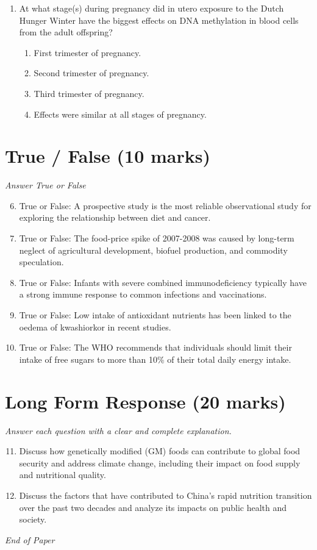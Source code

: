 \documentclass[12pt]{article}
\begin{document}
\begin{enumerate}[label=\arabic*.]
\begin{enumerate}[label=(\alph*)]
\end{enumerate}
\item At what stage(s) during pregnancy did in utero exposure to the Dutch Hunger Winter have the biggest effects on DNA methylation in blood cells from the adult offspring?
\begin{enumerate}[label=(\alph*)]
    \item First trimester of pregnancy.
    \item Second trimester of pregnancy.
    \item Third trimester of pregnancy.
    \item Effects were similar at all stages of pregnancy.
\end{enumerate}
\end{enumerate}

\section*{True / False (10 marks)}
\textit{Answer True or False}
\begin{enumerate}[label=\arabic*.]
\setcounter{enumi}{5}
\item True or False: A prospective study is the most reliable observational study for exploring the relationship between diet and cancer.
\item True or False: The food-price spike of 2007-2008 was caused by long-term neglect of agricultural development, biofuel production, and commodity speculation.
\item True or False: Infants with severe combined immunodeficiency typically have a strong immune response to common infections and vaccinations.
\item True or False: Low intake of antioxidant nutrients has been linked to the oedema of kwashiorkor in recent studies.
\item True or False: The WHO recommends that individuals should limit their intake of free sugars to more than 10\% of their total daily energy intake.
\end{enumerate}

\section*{Long Form Response (20 marks)}
\textit{Answer each question with a clear and complete explanation.}
\begin{enumerate}[label=\arabic*.]
\setcounter{enumi}{10}
\item Discuss how genetically modified (GM) foods can contribute to global food security and address climate change, including their impact on food supply and nutritional quality.
\item Discuss the factors that have contributed to China's rapid nutrition transition over the past two decades and analyze its impacts on public health and society.
\end{enumerate}

\vfill
\noindent\textit{End of Paper}
\end{document}
